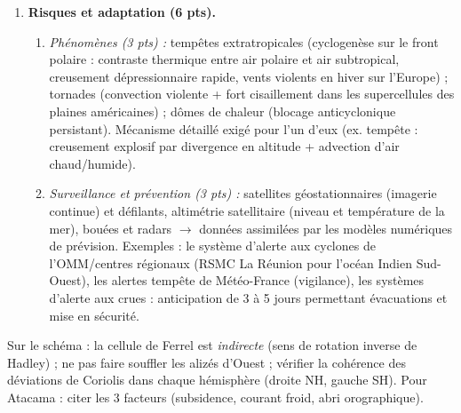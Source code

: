 \documentclass[11pt]{article}
\begin{document}
\begin{corrige}
\begin{enumerate}
\begin{enumerate}
    \end{enumerate}
    \item \textbf{Risques et adaptation (6 pts).}
    \begin{enumerate}
        \item \emph{Phénomènes (3 pts) :} tempêtes extratropicales (cyclogenèse sur le front polaire : contraste thermique entre air polaire et air subtropical, creusement dépressionnaire rapide, vents violents en hiver sur l'Europe) ; tornades (convection violente + fort cisaillement dans les supercellules des plaines américaines) ; dômes de chaleur (blocage anticyclonique persistant). Mécanisme détaillé exigé pour l'un d'eux (ex. tempête : creusement explosif par divergence en altitude + advection d'air chaud/humide).
        \item \emph{Surveillance et prévention (3 pts) :} satellites géostationnaires (imagerie continue) et défilants, altimétrie satellitaire (niveau et température de la mer), bouées et radars $\rightarrow$ données assimilées par les modèles numériques de prévision. Exemples : le système d'alerte aux cyclones de l'OMM/centres régionaux (RSMC La Réunion pour l'océan Indien Sud-Ouest), les alertes tempête de Météo-France (vigilance), les systèmes d'alerte aux crues : anticipation de 3 à 5 jours permettant évacuations et mise en sécurité.
    \end{enumerate}
\end{enumerate}
\end{corrige}

\begin{attention}
Sur le schéma : la cellule de Ferrel est \emph{indirecte} (sens de rotation inverse de Hadley) ; ne pas faire souffler les alizés d'Ouest ; vérifier la cohérence des déviations de Coriolis dans chaque hémisphère (droite NH, gauche SH). Pour Atacama : citer les 3 facteurs (subsidence, courant froid, abri orographique).
\end{attention}
\end{document}
